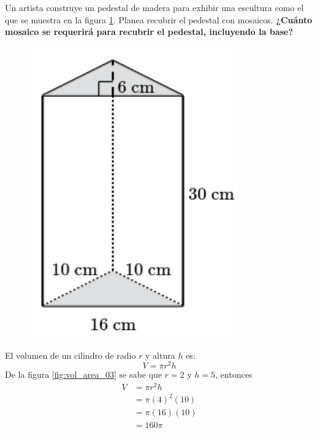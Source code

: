 \question[10] Un artista construye un pedestal de madera para exhibir una escultura como el que se muestra en la figura \ref{fig:prob_verb_superficie_01}.
Planea recubrir el pedestal con mosaicos.
\textbf{¿Cuánto mosaico se requerirá para recubrir el pedestal, incluyendo la base?}

\begin{minipage}{0.3\linewidth}
    \begin{figure}[H]
        \begin{center}
            \includegraphics[width=0.8\textwidth]{../images/prob_verb_superficie_01}
        \end{center}
        \caption{}
        \label{fig:prob_verb_superficie_01}
    \end{figure}
\end{minipage}
\begin{minipage}{0.7\linewidth}
    \begin{solutionbox}{6cm}
        El volumen de un cilindro de radio $r$ y altura $h$ es:
        \begin{equation*}
            V = \pi r^2 h
        \end{equation*}
        De la figura \ref{fig:vol_area_03} se sabe que $r=2$ y $h=5$, entonces
        \begin{equation*}
            \begin{split}
                V & = \pi r^2 h\\
                & = \pi (4)^2 (10)\\
                & = \pi (16) (10)\\
                & = 160\pi
            \end{split}
        \end{equation*}
    \end{solutionbox}
\end{minipage}